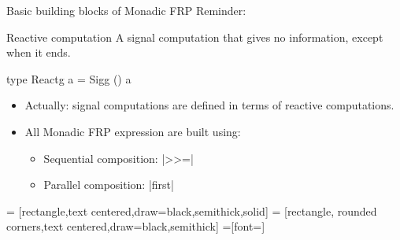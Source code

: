 \documentclass{beamer}
\begin{document}
\begin{frame}{Basic building blocks of Monadic FRP}
Reminder:
\begin{block}{Reactive computation}
A signal computation that gives no information, except when it ends.\\
\begin{code}
type Reactg     a  = Sigg () a
\end{code}
\end{block}

\begin{itemize}
\item Actually: signal computations are defined in terms of reactive computations.
\item All Monadic FRP expression are built using:
  \begin{itemize}
    \item Sequential composition: |>>=|
\item Parallel composition:  |first|
\end{itemize}
\end{itemize}



\end{frame}

\centering
{} = [rectangle,text centered,draw=black,semithick,solid]
 = [rectangle, rounded corners,text centered,draw=black,semithick]
 =[font=\small]
\end{document}
